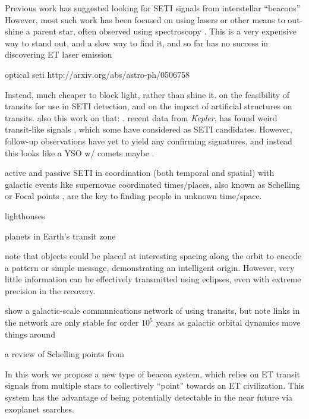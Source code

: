 \documentclass[modern]{aastex61}
\newcommand{\Kepler}{\textsl{Kepler}\xspace}
\begin{document}
Previous work has suggested looking for SETI signals from interstellar ``beacons''
\cite{benford2008}
However, most such work has been focused on using lasers or other means to out-shine a parent star, often observed using spectroscopy \cite{reines2002}. This is a very expensive way to stand out, and a slow way to find it, and so far has no success in discovering ET laser emission \cite{tellis2015}




optical seti
http://arxiv.org/abs/astro-ph/0506758

Instead, much cheaper to block light, rather than shine it.
\cite{arnold2005}
on the feasibility of transits for use in SETI detection, and 
\cite{arnold2005a}
on the impact of artificial structures on transits. also this work on that:
\cite{wright2016}.
recent data from \Kepler \citep{borucki2010}, has found weird transit-like signals
\cite{boyajian2015}, 
which some have considered as SETI candidates. However, follow-up observations have yet to yield any confirming signatures, and instead this looks like a YSO w/ comets maybe \citep{lisse2015}.

active and passive SETI in coordination (both temporal and spatial) with galactic events like supernovae 
\citep{lemarchand1994}
coordinated times/places, also known as Schelling or Focal points \citep{schelling1960}, are the key to finding people in unknown time/space.


lighthouses
\citep{zuluaga2015}

planets in Earth's transit zone \cite{heller2016}

\cite{arnold2005} note that objects could be placed at interesting spacing along the orbit to encode a pattern or simple message, demonstrating an intelligent origin. However, very little information can be effectively transmitted using eclipses, even with extreme precision in the recovery.

\cite{forgan2017} show a galactic-scale communications network of using transits, but note links in the network are only stable for order $10^5$ years as galactic orbital dynamics move things around

a review of Schelling points from \citet{wright2017}


In this work we propose a new type of beacon system, which relies on ET transit signals from multiple stars to collectively ``point'' towards an ET civilization. This system has the advantage of being potentially detectable in the near future via exoplanet searches.
\end{document}
